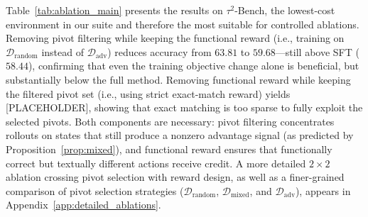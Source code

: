 Table~\ref{tab:ablation_main} presents the results on $\tau^2$-Bench, the lowest-cost environment in our suite and therefore the most suitable for controlled ablations. Removing pivot filtering while keeping the functional reward (i.e., training on $\mathcal{D}_{\mathrm{random}}$ instead of $\mathcal{D}_{\mathrm{adv}}$) reduces accuracy from $63.81$ to $59.68$---still above SFT ($58.44$), confirming that even the training objective change alone is beneficial, but substantially below the full method. Removing functional reward while keeping the filtered pivot set (i.e., using strict exact-match reward) yields [PLACEHOLDER], showing that exact matching is too sparse to fully exploit the selected pivots. Both components are necessary: pivot filtering concentrates rollouts on states that still produce a nonzero advantage signal (as predicted by Proposition~\ref{prop:mixed}), and functional reward ensures that functionally correct but textually different actions receive credit. A more detailed $2\times2$ ablation crossing pivot selection with reward design, as well as a finer-grained comparison of pivot selection strategies ($\mathcal{D}_{\mathrm{random}}$, $\mathcal{D}_{\mathrm{mixed}}$, and $\mathcal{D}_{\mathrm{adv}}$), appears in Appendix~\ref{app:detailed_ablations}.

